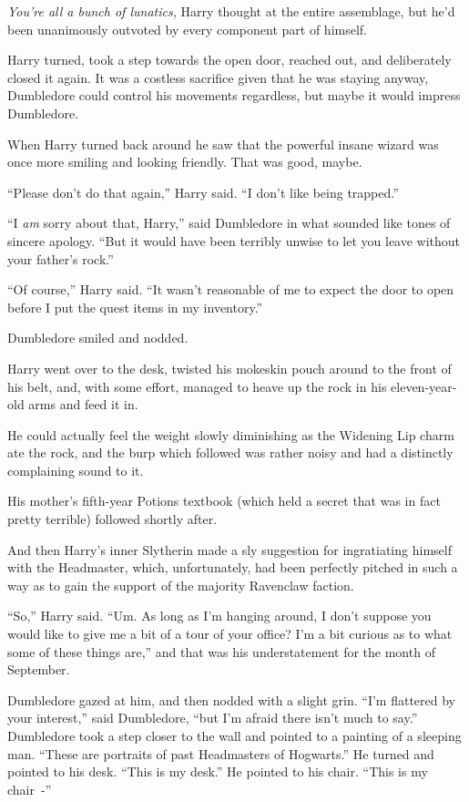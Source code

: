 \emph{You're all a bunch of lunatics,} Harry thought at the entire assemblage, but he'd been unanimously outvoted by every component part of himself.

Harry turned, took a step towards the open door, reached out, and deliberately closed it again. It was a costless sacrifice given that he was staying anyway, Dumbledore could control his movements regardless, but maybe it would impress Dumbledore.

When Harry turned back around he saw that the powerful insane wizard was once more smiling and looking friendly. That was good, maybe.

``Please don't do that again,'' Harry said. ``I don't like being trapped.''

``I \emph{am} sorry about that, Harry,'' said Dumbledore in what sounded like tones of sincere apology. ``But it would have been terribly unwise to let you leave without your father's rock.''

``Of course,'' Harry said. ``It wasn't reasonable of me to expect the door to open before I put the quest items in my inventory.''

Dumbledore smiled and nodded.

Harry went over to the desk, twisted his mokeskin pouch around to the front of his belt, and, with some effort, managed to heave up the rock in his eleven-year-old arms and feed it in.

He could actually feel the weight slowly diminishing as the Widening Lip charm ate the rock, and the burp which followed was rather noisy and had a distinctly complaining sound to it.

His mother's fifth-year Potions textbook (which held a secret that was in fact pretty terrible) followed shortly after.

And then Harry's inner Slytherin made a sly suggestion for ingratiating himself with the Headmaster, which, unfortunately, had been perfectly pitched in such a way as to gain the support of the majority Ravenclaw faction.

``So,'' Harry said. ``Um. As long as I'm hanging around, I don't suppose you would like to give me a bit of a tour of your office? I'm a bit curious as to what some of these things are,'' and that was his understatement for the month of September.

Dumbledore gazed at him, and then nodded with a slight grin. ``I'm flattered by your interest,'' said Dumbledore, ``but I'm afraid there isn't much to say.'' Dumbledore took a step closer to the wall and pointed to a painting of a sleeping man. ``These are portraits of past Headmasters of Hogwarts.'' He turned and pointed to his desk. ``This is my desk.'' He pointed to his chair. ``This is my chair~-''

